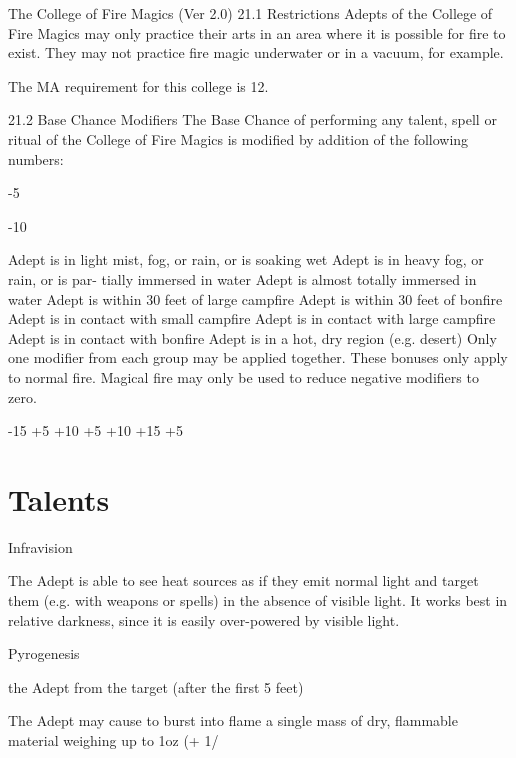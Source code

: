 \begin{Chapter}{The College of Fire Magics (Ver 2.0)}
21.1 Restrictions 
Adepts  of  the  College  of  Fire  Magics  may  only 
practice their arts in an area where it is possible for 
fire  to  exist.  They  may  not  practice  fire  magic 
underwater or in a vacuum, for example. 

The MA requirement for this college is 12. 

21.2 Base Chance Modifiers 
The Base Chance of performing any talent, spell or 
ritual of the College of Fire Magics is modified by 
addition of the following numbers: 

-5 

-10 

Adept is in light mist, fog, or rain, or is 
soaking wet 
Adept is in heavy fog, or rain, or is par-
tially immersed in water 
Adept is almost totally immersed in water 
Adept is within 30 feet of large campfire 
Adept is within 30 feet of bonfire 
Adept is in contact with small campfire 
Adept is in contact with large campfire 
Adept is in contact with bonfire 
Adept is in a hot, dry region (e.g. desert) 
Only one modifier from each group may be applied 
together. These bonuses only apply to normal fire. 
Magical  fire  may  only  be  used  to  reduce  negative 
modifiers to zero. 

-15 
+5 
+10 
+5 
+10 
+15 
+5 

\section{Talents}

\begin{talent}[T-1]{Infravision }

\begin{effects}
The Adept is able to see heat sources as if 
they  emit  normal  light  and  target  them  (e.g.  with 
weapons or spells) in the absence of visible light. It 
works  best  in  relative  darkness,  since  it  is  easily 
over-powered by visible light. 

\end{effects}
\end{talent}

\begin{talent}[T-2]{Pyrogenesis }

the Adept from the target (after the first 5 feet) 
\begin{effects}
The Adept may cause to burst into flame a 
single  mass  of  dry,  flammable  material  weighing 
up to 1oz (+ 1/ 


\end{effects}
\end{talent}
\end{Chapter}
